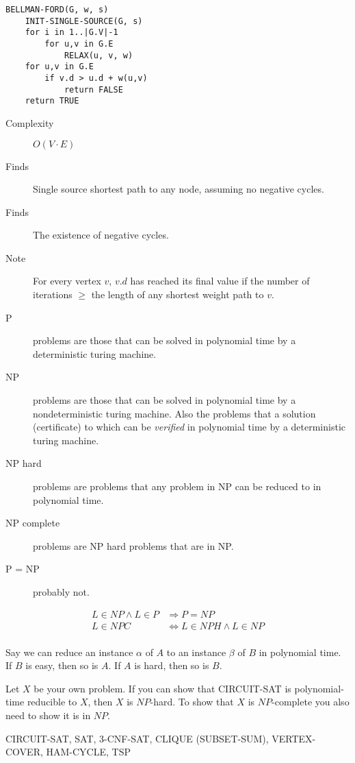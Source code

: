 \documentclass[10pt, a4paper,landscape]{article}
\begin{document}
\begin{multicols*}{4}
\begin{lstlisting}
BELLMAN-FORD(G, w, s)
    INIT-SINGLE-SOURCE(G, s)
    for i in 1..|G.V|-1
        for u,v in G.E
            RELAX(u, v, w)
    for u,v in G.E
        if v.d > u.d + w(u,v)
            return FALSE
    return TRUE
\end{lstlisting}

\begin{description}
    \item[Complexity] $O(V\cdot E)$
    \item[Finds] Single source shortest path to any node, assuming no negative cycles.
    \item[Finds] The existence of negative cycles.
    \item[Note] For every vertex $v$, $v.d$ has reached its final value if the number of iterations $\geq$ the length of any shortest weight path to $v$.
\end{description}

\begin{description}
    \item[P] problems are those that can be solved in polynomial time by a deterministic turing machine.
    \item[NP] problems are those that can be solved in polynomial time by a nondeterministic turing machine.
        Also the problems that a solution (certificate) to which can be \emph{verified} in polynomial time by a deterministic turing machine.
    \item[NP hard] problems are problems that any problem in NP can be reduced to in polynomial time.
    \item[NP complete] problems are NP hard problems that are in NP.
    \item[P = NP] probably not.
\end{description}

\begin{align*}
L \in NP \wedge L \in P &\Rightarrow P = NP\\
L \in NPC &\Leftrightarrow L \in NPH \wedge L \in NP\\
\end{align*}

Say we can reduce an instance $\alpha$ of $A$ to an instance $\beta$ of $B$ in polynomial time. If $B$ is easy, then so is $A$. If $A$ is hard, then so is $B$.

Let $X$ be your own problem. If you can show that CIRCUIT-SAT is polynomial-time reducible to $X$, then $X$ is $NP$-hard. To show that $X$ is $NP$-complete you also need to show it is in $NP$.


CIRCUIT-SAT, SAT, 3-CNF-SAT, CLIQUE (SUBSET-SUM), VERTEX-COVER, HAM-CYCLE, TSP


\end{multicols*}
\end{document}
